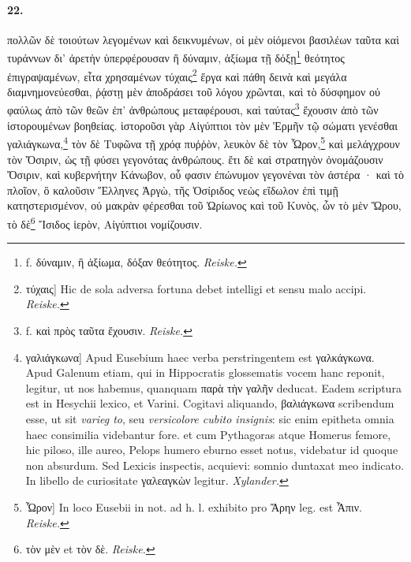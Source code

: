 \documentclass[a4paper, 11pt, oneside, polutonikogreek, german, landscape]{article}
\begin{document}
\paragraph{22.}
πολλῶν δὲ τοιούτων λεγομένων καὶ δεικνυμένων, οἱ μὲν οἰόμενοι βασιλέων ταῦτα καὶ τυράννων δι' ἀρετὴν ὑπερφέρουσαν ἢ δύναμιν, ἀξίωμα τῇ δόξῃ\footnote{f. δύναμιν, ἢ ἀξίωμα, δόξαν θεότητος. \emph{Reiske.}} θεότητος ἐπιγραψαμένων, εἶτα χρησαμένων τύχαις\footnote{τύχαις] Hic de sola adversa fortuna debet intelligi et sensu malo accipi. \emph{Reiske.}} ἔργα καὶ πάθη δεινὰ καὶ μεγάλα διαμνημονεύεσθαι, ῥᾴστῃ μὲν ἀποδράσει τοῦ λόγου χρῶνται, καὶ τὸ δύσφημον οὐ φαύλως ἀπὸ τῶν θεῶν ἐπ' ἀνθρώπους μεταφέρουσι, καὶ ταύτας\footnote{f. καὶ πρὸς ταῦτα ἔχουσιν. \emph{Reiske.}} ἔχουσιν ἀπὸ τῶν ἱστορουμένων βοηθείας. ἱστοροῦσι γὰρ Αἰγύπτιοι τὸν μὲν Ἑρμῆν τῷ σώματι γενέσθαι γαλιάγκωνα,\footnote{γαλιάγκωνα] Apud Eusebium haec verba perstringentem est γαλκάγκωνα. Apud Galenum etiam, qui in Hippocratis glossematis vocem hanc reponit, legitur, ut nos habemus, quanquam παρὰ τὴν γαλῆν deducat. Eadem scriptura est in Hesychii lexico, et Varini. Cogitavi aliquando, βαλιάγκωνα scribendum esse, ut sit \emph{varieg to}, seu \emph{versicolore cubito insignis}: sic enim epitheta omnia haec consimilia videbantur fore. et cum Pythagoras atque Homerus femore, hic piloso, ille aureo, Pelops humero eburno esset notus, videbatur id quoque non absurdum. Sed Lexicis inspectis, acquievi: somnio duntaxat meo indicato. In libello de curiositate γαλεαγκὼν legitur. \emph{Xylander.}} τὸν δὲ Τυφῶνα τῇ χρόᾳ πυῤῥὸν, λευκὸν δὲ τὸν Ὦρον,\footnote{Ὦρον] In loco Eusebii in not. ad h. l. exhibito pro Ἄρην leg. est Ἆπιν. \emph{Reiske.}} καὶ μελάγχρουν τὸν Ὄσιριν, ὡς τῇ φύσει γεγονότας ἀνθρώπους. ἔτι δὲ καὶ στρατηγὸν ὀνομάζουσιν Ὄσιριν, καὶ κυβερνήτην Κάνωβον, οὗ φασιν ἐπώνυμον γεγονέναι τὸν ἀστέρα · καὶ τὸ πλοῖον, ὃ καλοῦσιν Ἕλληνες Ἀργὼ, τῆς Ὀσίριδος νεὼς εἴδωλον ἐπὶ τιμῇ κατηστερισμένον, οὐ μακρὰν φέρεσθαι τοῦ Ὠρίωνος καὶ τοῦ Κυνὸς, ὧν τὸ μὲν Ὥρου, τὸ δὲ\footnote{τὸν μὲν et τὸν δὲ. \emph{Reiske.}} Ἴσιδος ἱερὸν, Αἰγύπτιοι νομίζουσιν.
\end{document}
